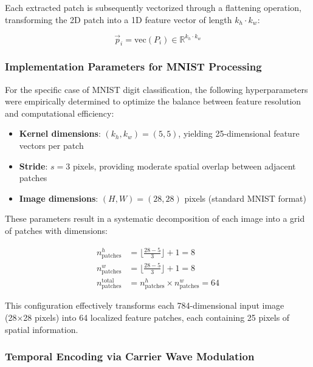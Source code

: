 \documentclass[11pt, oneside]{article}
\begin{document}
Each extracted patch is subsequently vectorized through a flattening operation, transforming the 2D patch into a 1D feature vector of length \(k_h \cdot k_w\):

\begin{equation}
    \vec{p}_i = \text{vec}(P_i) \in \mathbb{R}^{k_h \cdot k_w}
\end{equation}

\subsubsection{Implementation Parameters for MNIST Processing}

For the specific case of MNIST digit classification, the following hyperparameters were empirically determined to optimize the balance between feature resolution and computational efficiency:

\begin{itemize}
    \item \textbf{Kernel dimensions}: \((k_h, k_w) = (5, 5)\), yielding 25-dimensional feature vectors per patch
    \item \textbf{Stride}: \(s = 3\) pixels, providing moderate spatial overlap between adjacent patches
    \item \textbf{Image dimensions}: \((H, W) = (28, 28)\) pixels (standard MNIST format)
\end{itemize}

These parameters result in a systematic decomposition of each image into a grid of patches with dimensions:

\begin{align}
    n_{\text{patches}}^h              & = \lfloor\frac{28 - 5}{3}\rfloor + 1 = 8                \\
    n_{\text{patches}}^w              & = \lfloor\frac{28 - 5}{3}\rfloor + 1 = 8                \\
    n_{\text{patches}}^{\text{total}} & = n_{\text{patches}}^h \times n_{\text{patches}}^w = 64
\end{align}

This configuration effectively transforms each 784-dimensional input image (28×28 pixels) into 64 localized feature patches, each containing 25 pixels of spatial information.

\subsubsection{Temporal Encoding via Carrier Wave Modulation}
\end{document}
